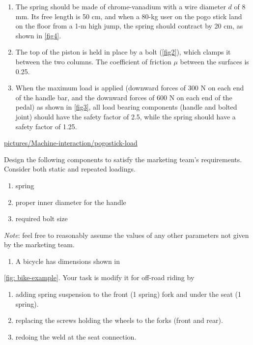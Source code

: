 \documentclass[a4paper,openany,12pt]{book}
\begin{document}
{{\begin{enumerate}
\item The spring should be made of chrome-vanadium with a wire diameter \(d\)
of 8 mm. Its free length is 50 cm, and when a 80-kg user on the pogo
stick land on the floor from a 1-m high jump, the spring should
contract by 20 cm, as shown in \ref{fig4}.

\item The top of the piston is held in place by a bolt (\ref{fig2}),
which clamps it between the two columns. The coefficient of friction
\(\mu\) between the surfaces is 0.25.

\item When the maximum load is applied (downward forces of 300 N on each
end of the handle bar, and the downward forces of 600 N on each end
of the pedal) as shown in \ref{fig3}, all load bearing
components (handle and bolted joint) should have the safety factor of
2.5, while the spring should have a safety factor of 1.25.
\end{enumerate}


\url{pictures/Machine-interaction/pogostick-load}

Design the following components to satisfy the marketing team's
requirements. Consider both static and repeated loadings.

\begin{enumerate}
\item spring

\item proper inner diameter for the handle

\item required bolt size
\end{enumerate}

\emph{Note}: feel free to reasonably assume the values of any other
parameters not given by the marketing team.

\begin{enumerate}
\item A bicycle has dimensions shown in
\end{enumerate}
\ref{fig: bike-example}. Your task is modify it for
off-road riding by

\begin{enumerate}
\item adding spring suspension to the front (1 spring) fork and under the
seat (1 spring).

\item replacing the screws holding the wheels to the forks (front and
rear).

\item redoing the weld at the seat connection.
\end{enumerate}

}}
\end{document}
